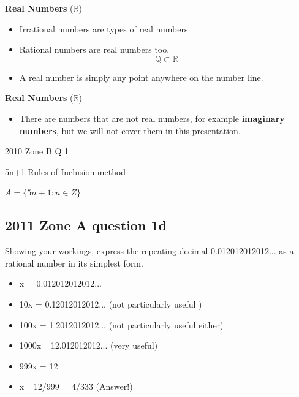 \documentclass[]{report}
\begin{document}
\begin{enumerate}
\textbf{Real Numbers} ($\mathbb{R}$)
\begin{itemize}
\item Irrational numbers are types of real numbers.
\item Rational numbers are real numbers too.
\[ \mathbb{Q}  \subset \mathbb{R}\]

\item A real number is simply any point anywhere on the number line.
\end{itemize}


\textbf{Real Numbers} ($\mathbb{R}$)
\begin{itemize}
\item There are numbers that are not real numbers, for example \textbf{imaginary numbers}, but we will not cover them in this presentation.
\end{itemize}


2010 Zone B Q 1

5n+1 Rules of Inclusion method

$A = \{5n+1: n \in Z \}$

\subsection*{2011 Zone A question 1d}

Showing your workings, express the repeating decimal 0.012012012012...
as a rational number in its simplest form.


\begin{itemize}
\item x = 0.012012012012...
\item 10x = 0.12012012012... (not particularly useful )
\item 100x = 1.2012012012... (not particularly useful either)
\item 1000x= 12.012012012... (very useful)
\item 999x = 12
\item x= 12/999 = 4/333 (Answer!)
\end{itemize}


\end{enumerate}
\end{document}
